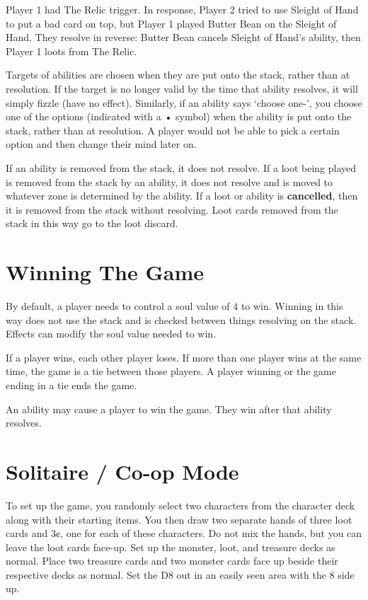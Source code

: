 \documentclass[a4paper, twoside]{report} %
\begin{document}
    Player 1 had The Relic trigger. In response, Player 2 tried to use Sleight of Hand to put a bad card on top, but Player 1 played Butter Bean on the Sleight of Hand. They resolve in reverse: Butter Bean cancels Sleight of Hand’s ability, then Player 1 loots from The Relic.

    Targets of abilities are chosen when they are put onto the stack, rather than at resolution. If the target is no longer valid by the time that ability resolves, it will simply fizzle (have no effect). Similarly, if an ability says ‘choose one-’, you choose one of the options (indicated with a • symbol) when the ability is put onto the stack, rather than at resolution. A player would not be able to pick a certain option and then change their mind later on.

    If an ability is removed from the stack, it does not resolve. If a loot being played is removed from the stack by an ability, it does not resolve and is moved to whatever zone is determined by the ability. If a loot or ability is \textbf{cancelled}, then it is removed from the stack without resolving. Loot cards removed from the stack in this way go to the loot discard.

    \chapter{Winning The Game}
    \label{winning}
    By default, a player needs to control a soul value of 4 to win. Winning in this way does not use the stack and is checked between things resolving on the stack. Effects can modify the soul value needed to win.

    If a player wins, each other player loses. If more than one player wins at the same time, the game is a tie between those players. A player winning or the game ending in a tie ends the game.

    An ability may cause a player to win the game. They win after that ability resolves.

    \chapter{Solitaire / Co-op Mode}
    \label{solitaire}
    To set up the game, you randomly select two characters from the character deck along with their starting items. You then draw two separate hands of three loot cards and 3¢, one for each of these characters. Do not mix the hands, but you can leave the loot cards face-up. Set up the monster, loot, and treasure decks as normal. Place two treasure cards and two monster cards face up beside their respective decks as normal. Set the D8 out in an easily seen area with the 8 side up.
\end{document}
